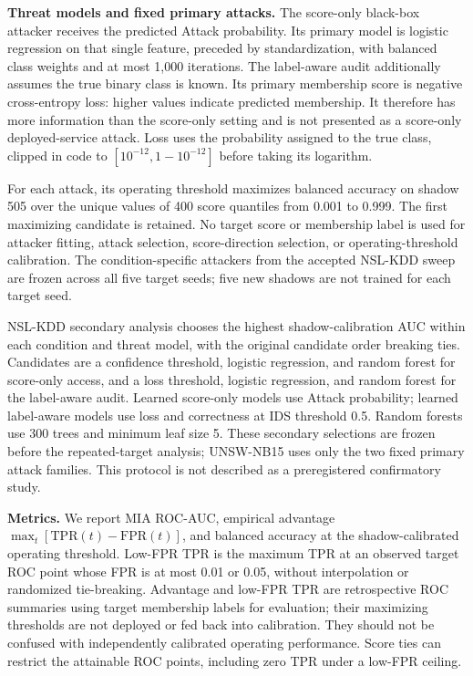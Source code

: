 \documentclass[11pt,a4paper]{article}
\begin{document}
\textbf{Threat models and fixed primary attacks.} The score-only
black-box attacker receives the predicted Attack probability. Its
primary model is logistic regression on that single feature, preceded by
standardization, with balanced class weights and at most 1,000
iterations. The label-aware audit additionally assumes the true binary
class is known. Its primary membership score is negative cross-entropy
loss: higher values indicate predicted membership. It therefore has more
information than the score-only setting and is not presented as a
score-only deployed-service attack. Loss uses the probability assigned
to the true class, clipped in code to \([10^{-12},1-10^{-12}]\) before
taking its logarithm.

For each attack, its operating threshold maximizes balanced accuracy on
shadow 505 over the unique values of 400 score quantiles from 0.001 to
0.999. The first maximizing candidate is retained. No target score or
membership label is used for attacker fitting, attack selection,
score-direction selection, or operating-threshold calibration. The
condition-specific attackers from the accepted NSL-KDD sweep are frozen
across all five target seeds; five new shadows are not trained for each
target seed.

NSL-KDD secondary analysis chooses the highest shadow-calibration AUC
within each condition and threat model, with the original candidate
order breaking ties. Candidates are a confidence threshold, logistic
regression, and random forest for score-only access, and a loss
threshold, logistic regression, and random forest for the label-aware
audit. Learned score-only models use Attack probability; learned
label-aware models use loss and correctness at IDS threshold 0.5. Random
forests use 300 trees and minimum leaf size 5. These secondary
selections are frozen before the repeated-target analysis; UNSW-NB15
uses only the two fixed primary attack families. This protocol is not
described as a preregistered confirmatory study.

\textbf{Metrics.} We report MIA ROC-AUC, empirical advantage
\(\max_t[\mathrm{TPR}(t)-\mathrm{FPR}(t)]\), and balanced accuracy at
the shadow-calibrated operating threshold. Low-FPR TPR is the maximum
TPR at an observed target ROC point whose FPR is at most 0.01 or 0.05,
without interpolation or randomized tie-breaking. Advantage and low-FPR
TPR are retrospective ROC summaries using target membership labels for
evaluation; their maximizing thresholds are not deployed or fed back
into calibration. They should not be confused with independently
calibrated operating performance. Score ties can restrict the attainable
ROC points, including zero TPR under a low-FPR ceiling.
\end{document}
